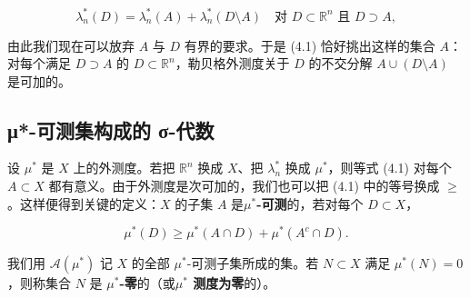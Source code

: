 \begin{equation}
\lambda_n^*(D) = \lambda_n^*(A) + \lambda_n^*(D \setminus A) \quad\text{对 } D \subset \mathbb{R}^n \text{ 且 } D \supset A ,\tag{4.1}
\end{equation}

由此我们现在可以放弃 $ A $ 与 $ D $ 有界的要求。于是 (4.1) 恰好挑出这样的集合 $ A $：对每个满足 $ D \supset A $ 的 $ D \subset \mathbb{R}^n $，勒贝格外测度关于 $ D $ 的不交分解 $ A \cup (D \setminus A) $ 是可加的。

\subsection*{μ*-可测集构成的 σ-代数}

设 $ \mu^* $ 是 $ X $ 上的外测度。若把 $ \mathbb{R}^n $ 换成 $ X $、把 $ \lambda_n^* $ 换成 $ \mu^* $，则等式 (4.1) 对每个 $ A \subset X $ 都有意义。由于外测度是次可加的，我们也可以把 (4.1) 中的等号换成 $ \ge $。这样便得到关键的定义：$ X $ 的子集 $ A $ 是\textbf{$ \mu^* $-可测}的，若对每个 $ D \subset X $，

\[
\mu^*(D) \ge \mu^*(A \cap D) + \mu^*(A^c \cap D) .
\]

我们用 $ \mathcal{A}(\mu^*) $ 记 $ X $ 的全部 $ \mu^* $-可测子集所成的集。若 $ N \subset X $ 满足 $ \mu^*(N) = 0 $，则称集合 $ N $ 是 \textbf{$ \mu^* $-零}的（或\textbf{$ \mu^* $ 测度为零}的）。


